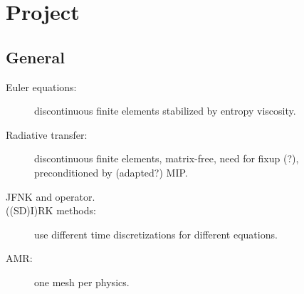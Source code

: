 \chapter{Project}
\section{General}
\begin{description}
  \item[Euler equations:] discontinuous finite elements stabilized by entropy
    viscosity.
  \item[Radiative transfer:] discontinuous finite elements, matrix-free,
    need for fixup (?), preconditioned by (adapted?) MIP.
  \item[JFNK and operator.]
  \item[((SD)I)RK methods:] use different time discretizations for different
    equations.
  \item[AMR:] one mesh per physics.
\end{description}

